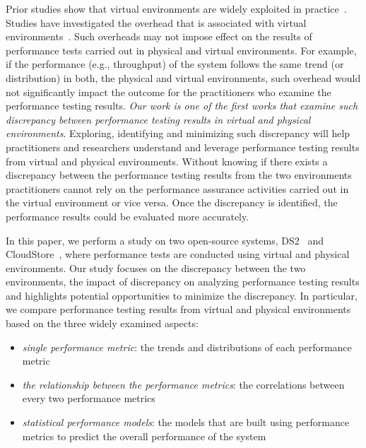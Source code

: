 \documentclass[smallextended]{svjour3}       %
\begin{document}
Prior studies show that virtual environments are widely exploited in practice~\cite{Cito:2015:MCA:2786805.2786826,Nguyen:2012:ADP:2188286.2188344,xiong2013vperfguard}. Studies have investigated the overhead that is associated with virtual environments~\cite{menon2005diagnosing}. Such overheads may not impose effect on the results of performance tests carried out in physical and virtual environments. For example, if the performance (e.g., throughput) of the system follows the same trend (or distribution) in both, the physical and virtual environments, such overhead would not significantly impact the outcome for the practitioners who examine the performance testing results. \textit{Our work is one of the first works that examine such discrepancy between performance testing results in virtual and physical environments}. Exploring, identifying and minimizing such discrepancy will help practitioners and researchers understand and leverage performance testing results from virtual and physical environments. Without knowing if there exists a discrepancy between the performance testing results from the two environments practitioners cannot rely on the performance assurance activities carried out in the virtual environment or vice versa. Once the discrepancy is identified, the performance results could be evaluated more accurately.

In this paper, we perform a study on two open-source systems, DS2~\cite{delldvd} and CloudStore~\cite{cloudstore}, where performance tests are conducted using virtual and physical environments. Our study focuses on the discrepancy between the two environments, the impact of discrepancy on analyzing performance testing results and highlights potential opportunities to minimize the discrepancy. In particular, we compare performance testing results from virtual and physical environments based on the three widely examined aspects:
\begin{itemize}
	\item \textit{single performance metric}: the trends and distributions of each performance metric
	\item \textit{the relationship between the performance metrics}: the correlations between every two performance metrics 
	\item \textit{statistical performance models}: the models that are built using performance metrics to predict the overall performance of the system

\end{itemize}
\end{document}
